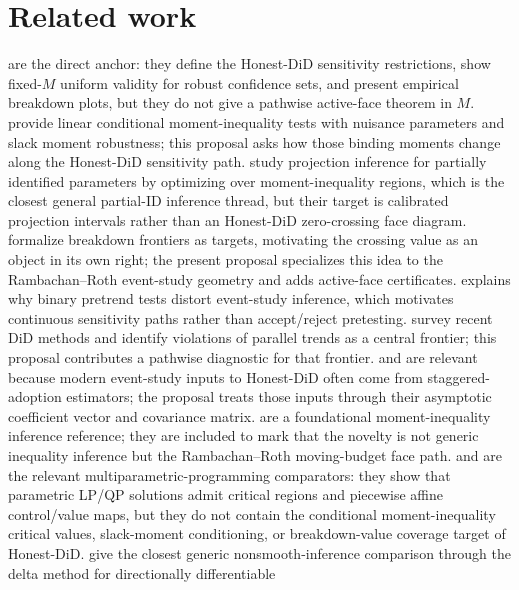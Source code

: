 \documentclass[11pt]{article}
\theoremstyle{definition}
\theoremstyle{plain}
\theoremstyle{remark}
\begin{document}
\section{Related work}
\citet{RambachanRoth2023} are the direct anchor: they define the Honest-DiD
sensitivity restrictions, show fixed-\(M\) uniform validity for robust
confidence sets, and present empirical breakdown plots, but they do not give a
pathwise active-face theorem in \(M\).  \citet{AndrewsRothPakes2023} provide
linear conditional moment-inequality tests with nuisance parameters and slack
moment robustness; this proposal asks how those binding moments change along
the Honest-DiD sensitivity path.  \citet{KaidoMolinariStoye2019} study
projection inference for partially identified parameters by optimizing over
moment-inequality regions, which is the closest general partial-ID inference
thread, but their target is calibrated projection intervals rather than an
Honest-DiD zero-crossing face diagram.  \citet{MastenPoirier2020} formalize
breakdown frontiers as targets, motivating the crossing value as an object in
its own right; the present proposal specializes this idea to the
Rambachan--Roth event-study geometry and adds active-face certificates.
\citet{Roth2022Pretrends} explains why binary pretrend tests distort
event-study inference, which motivates continuous sensitivity paths rather
than accept/reject pretesting.  \citet{RothSantAnnaBilinskiPoe2023} survey
recent DiD methods and identify violations of parallel trends as a central
frontier; this proposal contributes a pathwise diagnostic for that frontier.
\citet{SunAbraham2021} and \citet{CallawaySantAnna2021} are relevant because
modern event-study inputs to Honest-DiD often come from staggered-adoption
estimators; the proposal treats those inputs through their asymptotic
coefficient vector and covariance matrix.  \citet{ChernozhukovHongTamer2007}
are a foundational moment-inequality inference reference; they are included to
mark that the novelty is not generic inequality inference but the
Rambachan--Roth moving-budget face path.  \citet{GalNedoma1972} and
\citet{BemporadMorariDuaPistikopoulos2002} are the relevant
multiparametric-programming comparators: they show that parametric LP/QP
solutions admit critical regions and piecewise affine control/value maps, but
they do not contain the conditional moment-inequality critical values,
slack-moment conditioning, or breakdown-value coverage target of Honest-DiD.
\citet{FangSantos2019} give the closest generic nonsmooth-inference
comparison through the delta method for directionally differentiable
\end{document}
